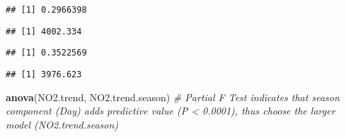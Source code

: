 \documentclass[
]{article}
\newenvironment{Shaded}{\begin{snugshade}}{\end{snugshade}}
\newcommand{\CommentTok}[1]{\textcolor[rgb]{0.56,0.35,0.01}{\textit{#1}}}
\newcommand{\KeywordTok}[1]{\textcolor[rgb]{0.13,0.29,0.53}{\textbf{#1}}}
\newcommand{\NormalTok}[1]{#1}
\newcommand{\OperatorTok}[1]{\textcolor[rgb]{0.81,0.36,0.00}{\textbf{#1}}}
\begin{document}
\begin{Shaded}
\end{Shaded}

\begin{verbatim}
## [1] 0.2966398
\end{verbatim}

\begin{Shaded}
\end{Shaded}

\begin{verbatim}
## [1] 4002.334
\end{verbatim}

\begin{Shaded}
\end{Shaded}

\begin{verbatim}
## [1] 0.3522569
\end{verbatim}

\begin{Shaded}
\end{Shaded}

\begin{verbatim}
## [1] 3976.623
\end{verbatim}

\begin{Shaded}
\begin{Highlighting}[]
\KeywordTok{anova}\NormalTok{(NO2.trend, NO2.trend.season) }\CommentTok{# Partial F Test indicates that season component (Day) adds predictive value (P < 0.0001), thus choose the larger model (NO2.trend.season)}
\end{Highlighting}
\end{Shaded}
\end{document}
